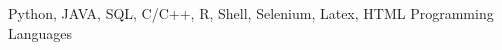 \begin{cventries}
    \cventry
    {Python, JAVA, SQL, C/C++, R, Shell, Selenium, Latex, HTML}
    {Programming Languages}
    {}
    {}
    {}
\end{cventries}
